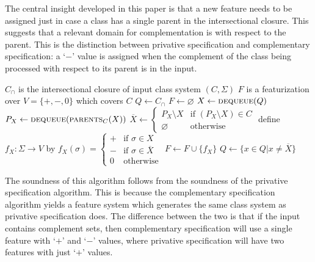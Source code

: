 \documentclass[12pt, oneside]{article}   	%
\begin{document}
The central insight developed in this paper is that a new feature needs to be assigned just in case a class has a single parent in the intersectional closure. This suggests that a relevant domain for complementation is with respect to the parent. This is the distinction between privative specification and complementary specification: a `$-$' value is assigned when the complement of the class being processed with respect to its parent is in the input.
\noindent \begin{algorithmic}
	\singlespacing
    \REQUIRE $C_\cap$ is the intersectional closure of input class system $(C, \Sigma)$
    \ENSURE $F$ is a featurization over $V = \{ +, -, 0 \}$ which covers $C$
    \STATE
    \STATE $Q \leftarrow C_\cap$
    \STATE $F \leftarrow \varnothing$
    \STATE
        \STATE $X \leftarrow \textsc{dequeue}(Q)$
            \STATE $P_X \leftarrow \textsc{dequeue}(\textsc{parents}_C(X))$
            \STATE
            \STATE $\overline{X} \leftarrow \begin{cases}
                P_X \setminus X & \text{if } (P_X \setminus X) \in C \\
                \varnothing     & \text{otherwise}
                \end{cases}$
            \STATE
            \STATE define $f_X : \Sigma \rightarrow V$ by $f_X (\sigma) = \begin{cases}
                    + & \text{if } \sigma \in X \\
                    - & \text{if } \sigma \in \overline{X} \\
                    0 & \text{otherwise}
                    \end{cases}$
            \STATE $F \leftarrow F \cup \{f_X\}$
            \STATE $Q \leftarrow \{x \in Q \vert x \neq \overline{X} \}$
        \ENDIF
    \ENDWHILE
\end{algorithmic}
\doublespacing

\noindent The soundness of this algorithm follows from the soundness of the privative specification algorithm. This is because the complementary specification algorithm yields a feature system which generates the same class system as privative specification does. The difference between the two is that if the input contains complement sets, then complementary specification will use a single feature with `$+$' and `$-$' values, where privative specification will have two features with just `$+$' values.
\end{document}
